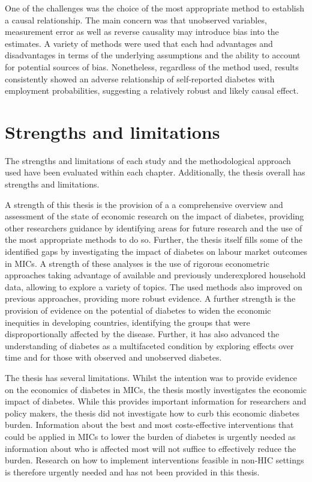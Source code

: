 One of the challenges was the choice of the most appropriate method to establish a causal relationship. The main concern was that unobserved variables, measurement error as well as reverse causality may introduce bias into the estimates. A variety of methods were used that each had advantages and disadvantages in terms of the underlying assumptions and the ability to account for potential sources of bias. Nonetheless, regardless of the method used, results consistently showed an adverse relationship of self-reported diabetes with employment probabilities, suggesting a relatively robust and likely causal effect.

\section{Strengths and limitations}

The strengths and limitations of each study and the methodological approach used have been evaluated within each chapter. Additionally, the thesis overall has strengths and limitations.

A strength of this thesis is the provision of a a comprehensive overview and assessment of the state of economic research on the impact of diabetes, providing other researchers guidance by identifying areas for future research and the use of the most appropriate methods to do so. Further, the thesis itself fills some of the identified gaps by investigating the impact of diabetes on labour market outcomes in \acp{MIC}. A strength of these analyses is the use of rigorous econometric approaches taking advantage of available and previously underexplored household data, allowing to explore a variety of topics. The used methods also improved on previous approaches, providing more robust evidence.  A further strength is the provision of evidence on the potential of diabetes to widen the economic inequities in developing countries, identifying the groups that were disproportionally affected by the disease. Further, it has also advanced the understanding of diabetes as a multifaceted condition by exploring effects over time and for those with observed and unobserved diabetes. 

The thesis has several limitations. Whilst the intention was to provide evidence on the economics of diabetes in \acp{MIC}, the thesis mostly investigates the economic impact of diabetes. While this provides important information for researchers and policy makers, the thesis did not investigate how to curb this economic diabetes burden. Information about the best and most costs-effective interventions that could be applied in \acp{MIC} to lower the burden of diabetes is urgently needed as information about who is affected most will not suffice to effectively reduce the burden. Research on how to implement interventions feasible in non-\ac{HIC} settings is therefore urgently needed and has not been provided in this thesis.

